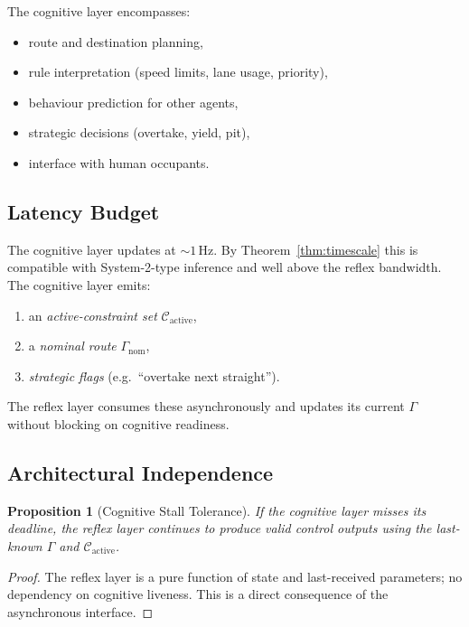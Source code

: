 \documentclass[11pt,twocolumn]{article}
\newtheorem{proposition}[theorem]{Proposition}
\theoremstyle{definition}
\theoremstyle{remark}
\providecommand{\cC}{\mathcal{C}}
\begin{document}
The cognitive layer encompasses:
\begin{itemize}[leftmargin=*,itemsep=2pt]
\item route and destination planning,
\item rule interpretation (speed limits, lane usage, priority),
\item behaviour prediction for other agents,
\item strategic decisions (overtake, yield, pit),
\item interface with human occupants.
\end{itemize}

\subsection{Latency Budget}

The cognitive layer updates at $\sim 1\,\mathrm{Hz}$. By Theorem~\ref{thm:timescale} this is compatible with System-2-type inference and well above the reflex bandwidth. The cognitive layer emits:
\begin{enumerate}[leftmargin=*]
\item an \emph{active-constraint set} $\cC_{\mathrm{active}}$,
\item a \emph{nominal route} $\Gamma_{\mathrm{nom}}$,
\item \emph{strategic flags} (e.g.\ ``overtake next straight'').
\end{enumerate}

The reflex layer consumes these asynchronously and updates its current $\Gamma$ without blocking on cognitive readiness.

\subsection{Architectural Independence}

\begin{proposition}[Cognitive Stall Tolerance]\label{prop:stall}
If the cognitive layer misses its deadline, the reflex layer continues to produce valid control outputs using the last-known $\Gamma$ and $\cC_{\mathrm{active}}$.
\end{proposition}

\begin{proof}
The reflex layer is a pure function of state and last-received parameters; no dependency on cognitive liveness. This is a direct consequence of the asynchronous interface.
\end{proof}
\end{document}
